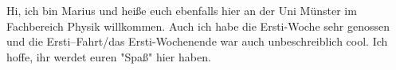 \begin{multicols*}{2}
{Hi, ich bin Marius und heiße euch ebenfalls hier an der Uni Münster im Fachbereich Physik willkommen. 
Auch ich habe die Ersti-Woche sehr genossen und die Ersti--Fahrt/das Ersti-Wochenende war auch unbeschreiblich cool.
Ich hoffe, ihr werdet euren "Spaß" hier haben.}


\end{multicols*}
